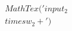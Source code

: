 \documentclass[preview]{standalone}
\begin{document}
\begin{align*}
MathTex('input _ 2  \\times  w _ 2  +')
\end{align*}
\end{document}
